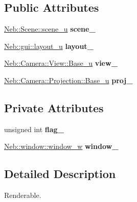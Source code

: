 \subsection*{\-Public \-Attributes}
\begin{DoxyCompactItemize}
\item 
\hypertarget{classNeb_1_1renderable_a7c92004d6b58759f1399cf1ed6da1e19}{\hyperlink{classNeb_1_1unique__ptr}{\-Neb\-::\-Scene\-::scene\-\_\-u} {\bfseries scene\-\_\-}}\label{classNeb_1_1renderable_a7c92004d6b58759f1399cf1ed6da1e19}

\item 
\hypertarget{classNeb_1_1renderable_a5e90c1aba3bb47b0071bd79a00975b49}{\hyperlink{classNeb_1_1unique__ptr}{\-Neb\-::gui\-::layout\-\_\-u} {\bfseries layout\-\_\-}}\label{classNeb_1_1renderable_a5e90c1aba3bb47b0071bd79a00975b49}

\item 
\hypertarget{classNeb_1_1renderable_a6585f1507f5afeb152b50fa2a103697a}{\hyperlink{classNeb_1_1unique__ptr}{\-Neb\-::\-Camera\-::\-View\-::\-Base\-\_\-u} {\bfseries view\-\_\-}}\label{classNeb_1_1renderable_a6585f1507f5afeb152b50fa2a103697a}

\item 
\hypertarget{classNeb_1_1renderable_a3178d18be5e839c357afefb42e85f788}{\hyperlink{classNeb_1_1unique__ptr}{\-Neb\-::\-Camera\-::\-Projection\-::\-Base\-\_\-u} {\bfseries proj\-\_\-}}\label{classNeb_1_1renderable_a3178d18be5e839c357afefb42e85f788}

\end{DoxyCompactItemize}
\subsection*{\-Private \-Attributes}
\begin{DoxyCompactItemize}
\item 
\hypertarget{classNeb_1_1renderable_a3c3a3a42294d977aac7a4deaccc098e2}{unsigned int {\bfseries flag\-\_\-}}\label{classNeb_1_1renderable_a3c3a3a42294d977aac7a4deaccc098e2}

\item 
\hypertarget{classNeb_1_1renderable_a4f8954124931d93eddf660c98a45cf7d}{\hyperlink{classNeb_1_1weak__ptr}{\-Neb\-::window\-::window\-\_\-w} {\bfseries window\-\_\-}}\label{classNeb_1_1renderable_a4f8954124931d93eddf660c98a45cf7d}

\end{DoxyCompactItemize}


\subsection{\-Detailed \-Description}
\-Renderable. 


